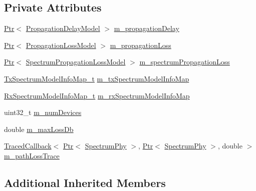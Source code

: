 \subsection*{Private Attributes}
\begin{DoxyCompactItemize}
\item 
\hyperlink{classns3_1_1Ptr}{Ptr}$<$ \hyperlink{classns3_1_1PropagationDelayModel}{Propagation\+Delay\+Model} $>$ \hyperlink{classns3_1_1MultiModelSpectrumChannel_a4a7d01850e693c72297d9d4a2faeb918}{m\+\_\+propagation\+Delay}
\item 
\hyperlink{classns3_1_1Ptr}{Ptr}$<$ \hyperlink{classns3_1_1PropagationLossModel}{Propagation\+Loss\+Model} $>$ \hyperlink{classns3_1_1MultiModelSpectrumChannel_a7b0ae25fd33c9fbccf4984526abb0827}{m\+\_\+propagation\+Loss}
\item 
\hyperlink{classns3_1_1Ptr}{Ptr}$<$ \hyperlink{classns3_1_1SpectrumPropagationLossModel}{Spectrum\+Propagation\+Loss\+Model} $>$ \hyperlink{classns3_1_1MultiModelSpectrumChannel_a669cb9c95a0a28cc26473ffea7640eab}{m\+\_\+spectrum\+Propagation\+Loss}
\item 
\hyperlink{group__spectrum_ga3b72b7d13697ed8fe482072a7096c289}{Tx\+Spectrum\+Model\+Info\+Map\+\_\+t} \hyperlink{classns3_1_1MultiModelSpectrumChannel_a401a74579865429a5008431e9000a8be}{m\+\_\+tx\+Spectrum\+Model\+Info\+Map}
\item 
\hyperlink{group__spectrum_ga801b24c7ce914a3fc46a57a68bae76ee}{Rx\+Spectrum\+Model\+Info\+Map\+\_\+t} \hyperlink{classns3_1_1MultiModelSpectrumChannel_af75faef47b2e879fd82de7364ac2bcd0}{m\+\_\+rx\+Spectrum\+Model\+Info\+Map}
\item 
uint32\+\_\+t \hyperlink{classns3_1_1MultiModelSpectrumChannel_a7f0e7254387c3080acb99e0d51f58700}{m\+\_\+num\+Devices}
\item 
double \hyperlink{classns3_1_1MultiModelSpectrumChannel_ace74651203888ff5d63dfae0c96b0979}{m\+\_\+max\+Loss\+Db}
\item 
\hyperlink{classns3_1_1TracedCallback}{Traced\+Callback}$<$ \hyperlink{classns3_1_1Ptr}{Ptr}$<$ \hyperlink{classns3_1_1SpectrumPhy}{Spectrum\+Phy} $>$, \hyperlink{classns3_1_1Ptr}{Ptr}$<$ \hyperlink{classns3_1_1SpectrumPhy}{Spectrum\+Phy} $>$, double $>$ \hyperlink{classns3_1_1MultiModelSpectrumChannel_ab3333c1804de2472073cf3725f6f7f59}{m\+\_\+path\+Loss\+Trace}
\end{DoxyCompactItemize}
\subsection*{Additional Inherited Members}


